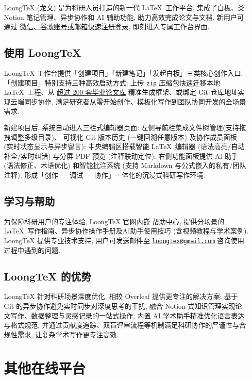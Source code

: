 \href{https://www.loongtex.com/}{LoongTeX (龙文)}
是为科研人员打造的新一代 \LaTeX\ 工作平台,
集成了白板、类 Notion 笔记管理、异步协作和 AI 辅助功能, 助力高效完成论文与文档.
新用户可通过%
\href{https://app.loongtex.com/user/login}{微信、谷歌账号或邮箱快速注册登录},
即刻进入专属工作台界面.

\subsection{使用 LoongTeX}

LoongTeX 工作台提供「创建项目」「新建笔记」「发起白板」三类核心创作入口,
「创建项目」特别支持三种高效启动方式: 上传 \texttt{zip} 压缩包快速迁移本地 \LaTeX\ 工程、从%
\href{https://www.loongtex.com/templates/}{超过 200 套毕业论文库}%
精准生成框架、或绑定 Git 仓库地址实现云端同步协作,
满足研究者从零开始创作、模板化写作到团队协同开发的全场景需求.

新建项目后, 系统自动进入三栏式编辑器页面: 左侧导航栏集成文件树管理(支持拖拽调整多级目录)、
可视化 Git 版本历史 (一键回溯任意版本) 及协作成员面板 (实时状态显示与异步留言);
中央编辑区搭载智能 \LaTeX\ 编辑器 (语法高亮/自动补全/实时纠错)
与分屏 PDF 预览 (注释联动定位);
右侧功能面板提供 AI 助手 (语法修正、术语优化)
和智能批注系统 (支持 Markdown 与公式嵌入的私有/团队注释),
形成「创作 --- 调试 --- 协作」一体化的沉浸式科研写作环境.

\subsection{学习与帮助}

为保障科研用户的专注体验, LoongTeX 官网内嵌%
\href{https://www.loongtex.com/docs/app/help/}{帮助中心},
提供分场景的 \LaTeX\ 写作指南、异步协作操作手册及AI助手使用技巧 (含视频教程与学术案例).
LoongTeX 提供专业技术支持, 用户可发送邮件至
\href{mailto:loongtex@gmail.com}{\texttt{loongtex@gmail.com}}
咨询使用过程中遇到的问题.

\subsection{LoongTeX 的优势}

LoongTeX 针对科研场景深度优化, 相较 Overleaf 提供更专注的解决方案:
基于 Git 的异步协作避免实时同步对深度思考的干扰,
融合 Notion 式知识管理实现论文写作、数据整理与灵感记录的一站式操作,
内置 AI 学术助手精准优化语言表达与格式规范,
并通过贡献度追踪、双盲评审流程等机制满足科研协作的严谨性与合规性需求,
让复杂学术写作更专注高效.

\section{其他在线平台}

